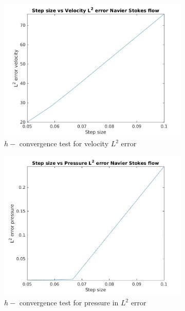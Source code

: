 \documentclass[a4paper]{book}
\begin{document}
\begin{figure}
\begin{subfigure}{\textwidth}	
  \includegraphics[width=\linewidth]{L2_convergence_velocity_n_s.jpg}
  \caption{$h-$ convergence test for velocity $L^2$ error}
  \label{fig:vel_navier_stoke_conv}
\end{subfigure}
\begin{subfigure}{\textwidth}	
  \includegraphics[width=\linewidth]{L2_convergence_pressure_n_s.jpg}
  \caption{$h-$ convergence test for pressure in $L^2$ error}
  \label{fig:pre_navier_stoke_conv}
\end{subfigure}
\caption{\label{navier_stoke_conv_l2}}
\end{figure}
\end{document}
